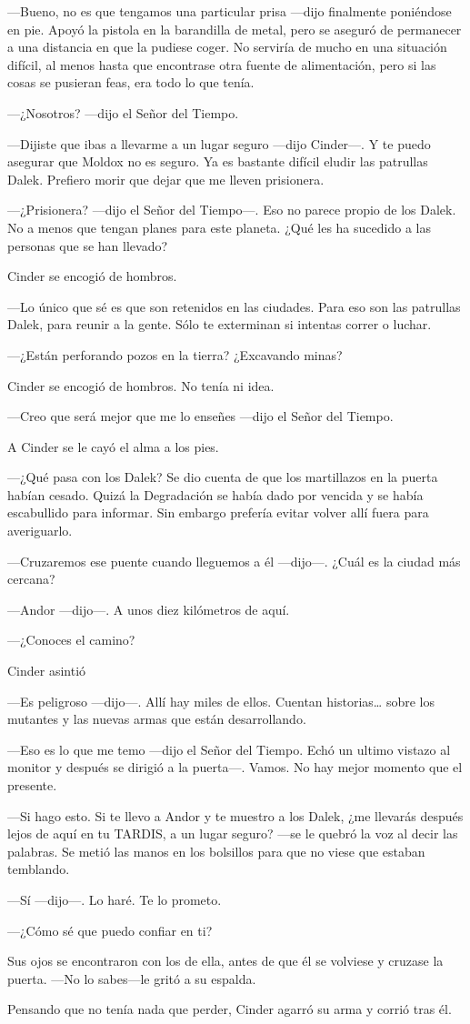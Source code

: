 —Bueno, no es que tengamos una particular prisa —dijo finalmente poniéndose en pie. Apoyó la pistola en la barandilla de metal, pero se aseguró de permanecer a una distancia en que la pudiese coger. No serviría de mucho en una situación difícil, al menos hasta que encontrase otra fuente de alimentación, pero si las cosas se pusieran feas, era todo lo que tenía. 

—¿Nosotros? —dijo el Señor del Tiempo. 

—Dijiste que ibas a llevarme a un lugar seguro —dijo Cinder—. Y te puedo asegurar que Moldox no es seguro. Ya es bastante difícil eludir las patrullas Dalek. Prefiero morir que dejar que me lleven prisionera. 

—¿Prisionera? —dijo el Señor del Tiempo—. Eso no parece propio de los Dalek. No a menos que tengan planes para este planeta. ¿Qué les ha sucedido a las personas que se han llevado? 

Cinder se encogió de hombros. 

—Lo único que sé es que son retenidos en las ciudades. Para eso son las patrullas Dalek, para reunir a la gente. Sólo te exterminan si intentas correr o luchar. 

—¿Están perforando pozos en la tierra? ¿Excavando minas? 

Cinder se encogió de hombros. No tenía ni idea. 

—Creo que será mejor que me lo enseñes —dijo el Señor del Tiempo. 

A Cinder se le cayó el alma a los pies. 

—¿Qué pasa con los Dalek? Se dio cuenta de que los martillazos en la puerta habían cesado. Quizá la Degradación se había dado por vencida y se había escabullido para informar. Sin embargo prefería evitar volver allí fuera para averiguarlo. 

—Cruzaremos ese puente cuando lleguemos a él —dijo—. ¿Cuál es la ciudad más cercana?

—Andor —dijo—. A unos diez kilómetros de aquí. 

—¿Conoces el camino?

Cinder asintió 

—Es peligroso —dijo—. Allí hay miles de ellos. Cuentan historias… sobre los mutantes y las nuevas armas que están desarrollando. 

—Eso es lo que me temo —dijo el Señor del Tiempo. Echó un ultimo vistazo al monitor y después se dirigió a la puerta—. Vamos. No hay mejor momento que el presente. 

—Si hago esto. Si te llevo a Andor y te muestro a los Dalek, ¿me llevarás después lejos de aquí en tu TARDIS, a un lugar seguro? —se le quebró la voz al decir las palabras. Se metió las manos en los bolsillos para que no viese que estaban temblando. 

—Sí —dijo—. Lo haré. Te lo prometo. 

—¿Cómo sé que puedo confiar en ti? 

Sus ojos se encontraron con los de ella, antes de que él se volviese y cruzase la puerta. —No lo sabes—le gritó a su espalda. 

Pensando que no tenía nada que perder, Cinder agarró su arma y corrió tras él.



